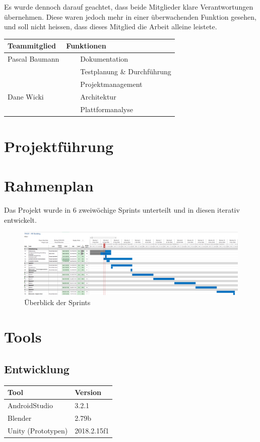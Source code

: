 \documentclass[a4paper]{scrreprt}
\newcommand{\tabitem}{~~\llap{\textbullet}~~}
\begin{document}
Es wurde dennoch darauf geachtet, dass beide Mitglieder klare Verantwortungen übernehmen. Diese waren jedoch mehr in einer überwachenden Funktion gesehen, und soll nicht heissen, dass dieses Mitglied die Arbeit alleine leistete.

\vspace{1em}

\begin{tabularx}{\textwidth}{|X|X|}
	\hline
	\textbf{Teammitglied} & \textbf{Funktionen} \\
	\hline
	Pascal Baumann & \tabitem Dokumentation \\
	& \tabitem Testplanung \& Durchführung \\
	& \tabitem Projektmanagement \\
	\hline
	Dane Wicki & \tabitem Architektur \\
	& \tabitem Plattformanalyse \\
	\hline
\end{tabularx}

\newpage
\section{Projektführung}

\section{Rahmenplan}

Das Projekt wurde in 6 zweiwöchige Sprints unterteilt und in diesen iterativ entwickelt.

\vspace{1em}

\begin{figure}[h!]
	\includegraphics[keepaspectratio, width=\textwidth]{Rahmenplan}
	\caption{Überblick der Sprints}
\end{figure}

\section{Tools}
\label{sec:Tools}
\subsection{Entwicklung}
\begin{table}[h!]
	\begin{tabular}{p{} p{}}
		\hline
		\textbf{Tool} & \textbf{Version} \\
		\hline
		AndroidStudio & 3.2.1 \\
		\hline
		Blender & 2.79b \\
		\hline
		Unity (Prototypen) & 2018.2.15f1 \\
		\hline
	\end{tabular}
\end{table}
\end{document}
